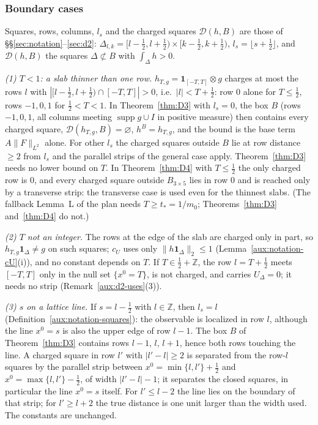 \documentclass[11pt,a4paper]{article}
\theoremstyle{plain}
\theoremstyle{definition}
\theoremstyle{plain}
\theoremstyle{definition}
\newcommand{\Z}{\mathbb{Z}}
\DeclareMathOperator{\supp}{supp}
\begin{document}
\subsubsection{Boundary cases}\label{sec:quant-boundary}

Squares, rows, columns, $l_s$ and the charged squares $\mathcal D(h,B)$ are those of
\S\S\ref{sec:notation}--\ref{sec:d2}: $\Delta_{l,k}=[l-\frac12,l+\frac12)\times
[k-\frac12,k+\frac12)$, $l_s=\lfloor s+\frac12\rfloor$, and $\mathcal D(h,B)$ the squares
$\Delta\not\subset B$ with $\int_\Delta h>0$.

\emph{(1) $T<1$: a slab thinner than one row.} $h_{T,g}=\mathbf 1_{[-T,T]}\otimes g$ charges at
most the rows $l$ with $|[l-\frac12,l+\frac12)\cap[-T,T]|>0$, i.e.\ $|l|<T+\frac12$: row $0$
alone for $T\le\frac12$, rows $-1,0,1$ for $\frac12<T<1$. In Theorem~\ref{thm:D3} with
$l_s=0$, the box $B$ (rows $-1,0,1$, all columns meeting $\supp g\cup I$ in positive measure)
then contains every charged square, $\mathcal D(h_{T,g},B)=\varnothing$, $h^B=h_{T,g}$, and the
bound is the base term $A\|F\|_{L^2}$ alone. For other $l_s$ the charged squares outside $B$ lie
at row distance $\ge2$ from $l_s$ and the parallel strips of the general case apply.
Theorem~\ref{thm:D3} needs no lower bound on $T$. In Theorem~\ref{thm:D4} with $T\le\frac12$
the only charged row is $0$, and every charged square outside $B_{3\times5}$ lies in row $0$
and is reached only by a transverse strip: the transverse case is used even for the thinnest
slabs. (The fallback Lemma~L of the plan needs $T\ge t_*=1/m_0$; Theorems~\ref{thm:D3}
and~\ref{thm:D4} do not.)

\emph{(2) $T$ not an integer.} The rows at the edge of the slab are charged only in part, so
$h_{T,g}\mathbf 1_\Delta\ne g$ on such squares; $c_U$ uses only
$\|h\mathbf 1_\Delta\|_2\le1$ (Lemma~\ref{aux:notation-cU}(i)), and no constant depends on $T$.
If $T\in\frac12+\Z$, the row $l=T+\frac12$ meets $[-T,T]$ only in the null set $\{x^0=T\}$, is
not charged, and carries $U_\Delta=0$; it needs no strip (Remark~\ref{aux:d2-uses}(3)).

\emph{(3) $s$ on a lattice line.} If $s=l-\frac12$ with $l\in\Z$, then $l_s=l$
(Definition~\ref{aux:notation-squares}): the observable is localized in row $l$, although the
line $x^0=s$ is also the upper edge of row $l-1$. The box $B$ of Theorem~\ref{thm:D3} contains
rows $l-1$, $l$, $l+1$, hence both rows touching the line. A charged square in row $l'$ with
$|l'-l|\ge2$ is separated from the row-$l$ squares by the parallel strip between
$x^0=\min\{l,l'\}+\frac12$ and $x^0=\max\{l,l'\}-\frac12$, of width $|l'-l|-1$; it separates the
closed squares, in particular the line $x^0=s$ itself. For $l'\le l-2$ the line lies on the
boundary of that strip; for $l'\ge l+2$ the true distance is one unit larger than the width
used. The constants are unchanged.
\end{document}
